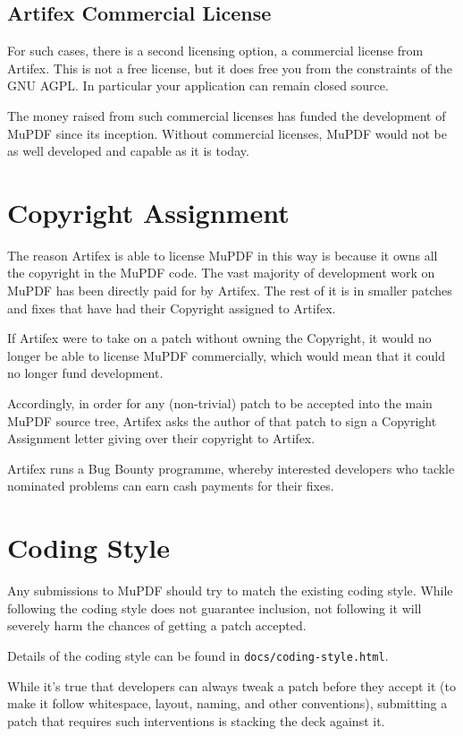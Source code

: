 \documentclass[oneside]{book}
\begin{document}
\subsection{Artifex Commercial License}

For such cases, there is a second licensing option, a commercial license from Artifex. This is not a free license, but it does free you from the constraints of the GNU AGPL. In particular your application can remain closed source.

The money raised from such commercial licenses has funded the development of MuPDF since its inception. Without commercial licenses, MuPDF would not be as well developed and capable as it is today.

\section{Copyright Assignment}

The reason Artifex is able to license MuPDF in this way is because it owns all the copyright in the MuPDF code. The vast majority of development work on MuPDF has been directly paid for by Artifex. The rest of it is in smaller patches and fixes that have had their Copyright assigned to Artifex.

If Artifex were to take on a patch without owning the Copyright, it would no longer be able to license MuPDF commercially, which would mean that it could no longer fund development.

Accordingly, in order for any (non-trivial) patch to be accepted into the main MuPDF source tree, Artifex asks the author of that patch to sign a Copyright Assignment letter giving over their copyright to Artifex.

Artifex runs a Bug Bounty programme, whereby interested developers who tackle nominated problems can earn cash payments for their fixes.


\section{Coding Style}

Any submissions to MuPDF should try to match the existing coding style. While following the coding style does not guarantee inclusion, not following it will severely harm the chances of getting a patch accepted.

Details of the coding style can be found in \texttt{docs/coding-style.html}.

While it's true that developers can always tweak a patch before they accept it (to make it follow whitespace, layout, naming, and other conventions), submitting a patch that requires such interventions is stacking the deck against it.
\end{document}
